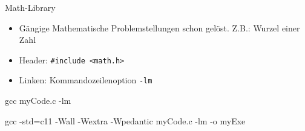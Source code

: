 
\begin{frame}[fragile]{Math-Library}
%
\begin{itemize}
\item Gängige Mathematische Problemstellungen schon gelöst. Z.\;B.: Wurzel einer Zahl
\item Header: \texttt{#include <math.h>}
\item Linken: Kommandozeilenoption \texttt{-lm}
\end{itemize}
%
\begin{cmdbox}
gcc myCode.c -lm
\end{cmdbox}
\begin{cmdbox}
gcc -std=c11 -Wall -Wextra -Wpedantic myCode.c -lm -o myExe
\end{cmdbox}
%
\end{frame}


